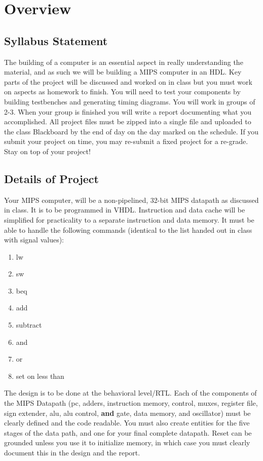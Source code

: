 \chapter{Overview}

\section{Syllabus Statement}
The building of a computer is an essential aspect in really understanding the material, and as such we will be
building a MIPS computer in an HDL.  Key parts of the project will be discussed and worked on in class but you
must work on aspects as homework to finish.  You will need to test your components by building testbenches and
generating timing diagrams.  You will work in groups of 2-3. When your group is finished you will write a report
documenting what you accomplished.  All project files must be zipped into a single
file and uploaded to the class Blackboard by the end of day on the day marked on the schedule.  If you submit your project
on time, you may re-submit a fixed project for a re-grade.  Stay on top of your project!

\section{Details of Project}

Your MIPS computer, will be a non-pipelined, 32-bit MIPS datapath as discussed in class.  It is to be programmed in VHDL.  Instruction and data cache will be simplified for practicality to a separate instruction and data memory.  It must be able to handle the following commands (identical to the list handed out in class with signal values):
\begin{enumerate}
\item lw
\item sw
\item beq
\item add
\item subtract
\item and
\item or
\item set on less than
\end{enumerate}
The design is to be done at the behavioral level/RTL.  Each of the components of the MIPS Datapath (pc, adders, instruction memory, control, muxes, register file, sign extender, alu, alu control, \textbf{and} gate, data memory, and oscillator) must be clearly defined and the code readable.  You must also create entities for the five stages of the data path, and one for your final complete datapath.  Reset can be grounded unless you use it to initialize memory, in which case you must clearly document this in the design and the report.

